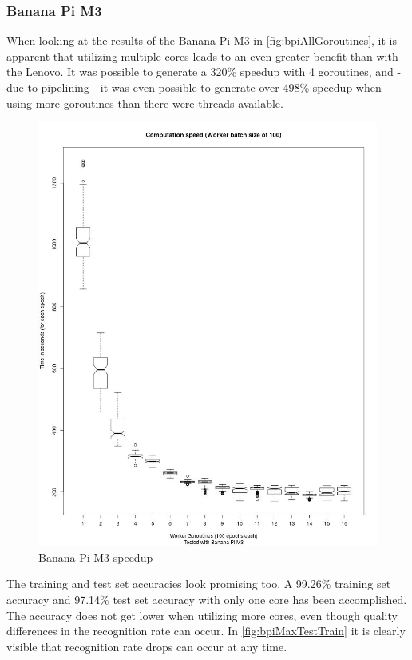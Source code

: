 \documentclass[11pt]{article}
\begin{document}
\subsubsection{Banana Pi M3}
When looking at the results of the Banana Pi M3 in \autoref{fig:bpiAllGoroutines}, it is apparent that utilizing multiple cores leads to an even greater benefit than with the Lenovo. It was possible to generate a 320\% speedup with 4 goroutines, and - due to pipelining - it was even possible to generate over 498\% speedup when using more goroutines than there were threads available.
\begin{figure}[H]
	\centering
	\includegraphics[width=1.0\textwidth, height=0.75\textheight]{./Data/Final/Images/bpiAllGoroutines.jpg}
	\vspace{-1em}
	\caption{Banana Pi M3 speedup}
	\vspace{-0.5em}
	\label{fig:bpiAllGoroutines}
\end{figure}

The training and test set accuracies look promising too. A 99.26\% training set accuracy and 97.14\% test set accuracy with only one core has been accomplished. The accuracy does not get lower when utilizing more cores, even though quality differences in the recognition rate can occur. In \autoref{fig:bpiMaxTestTrain} it is clearly visible that recognition rate drops can occur at any time.
\end{document}
